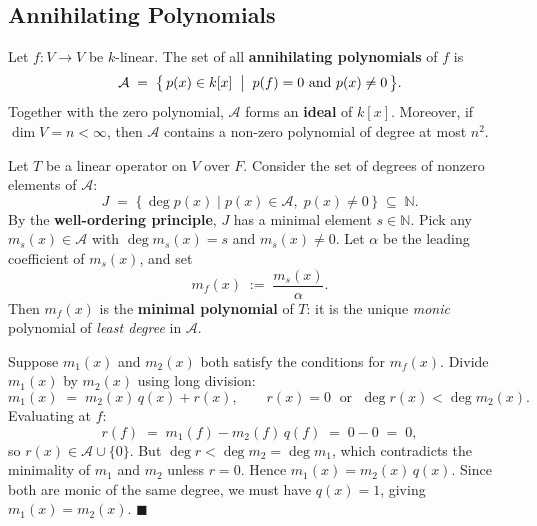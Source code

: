 \subsection{Annihilating Polynomials}

\begin{defbox}
Let $f: V \to V$ be $k$-linear.  The set of all \textbf{annihilating
polynomials} of $f$ is
\[
  \mathcal{A}
  \;=\;
  \bigl\{\, p(x) \in k[x] \;\bigm|\; p(f) = 0 \text{ and } p(x) \neq 0 \,\bigr\}.
\]
Together with the zero polynomial, $\mathcal{A}$ forms an
\textbf{ideal} of $k[x]$.  Moreover, if $\dim V = n < \infty$, then
$\mathcal{A}$ contains a non-zero polynomial of degree at most $n^2$.
\end{defbox}

\begin{defbox}
Let $T$ be a linear operator on $V$ over $F$. Consider the set of degrees of nonzero elements of $\mathcal{A}$:
\[
  J \;=\; \{\, \deg p(x) \mid p(x) \in \mathcal{A},\; p(x) \neq 0 \,\} \;\subseteq\; \mathbb{N}.
\]
By the \textbf{well-ordering principle}, $J$ has a minimal element $s \in \mathbb{N}$.
Pick any $m_s(x) \in \mathcal{A}$ with $\deg m_s(x) = s$ and $m_s(x) \neq 0$.
Let $\alpha$ be the leading coefficient of $m_s(x)$, and set
\[
  m_f(x) \;:=\; \frac{m_s(x)}{\alpha}.
\]
Then $m_f(x)$ is the \textbf{minimal polynomial} of $T$: it is the unique
\emph{monic} polynomial of \emph{least degree} in $\mathcal{A}$.
\end{defbox}

\begin{proofbox}
Suppose $m_1(x)$ and $m_2(x)$ both satisfy the conditions for $m_f(x)$.
Divide $m_1(x)$ by $m_2(x)$ using long division:
\[
  m_1(x) \;=\; m_2(x)\,q(x) + r(x),
  \qquad
  r(x) = 0 \;\text{ or }\; \deg r(x) < \deg m_2(x).
\]
Evaluating at $f$:
\[
  r(f) \;=\; m_1(f) - m_2(f)\,q(f) \;=\; 0 - 0 \;=\; 0,
\]
so $r(x) \in \mathcal{A} \cup \{0\}$.  But $\deg r < \deg m_2 = \deg m_1$,
which contradicts the minimality of $m_1$ and $m_2$ unless $r = 0$.
Hence $m_1(x) = m_2(x)\,q(x)$.  Since both are monic of the same
degree, we must have $q(x) = 1$, giving $m_1(x) = m_2(x)$.
\hfill$\blacksquare$
\end{proofbox}

